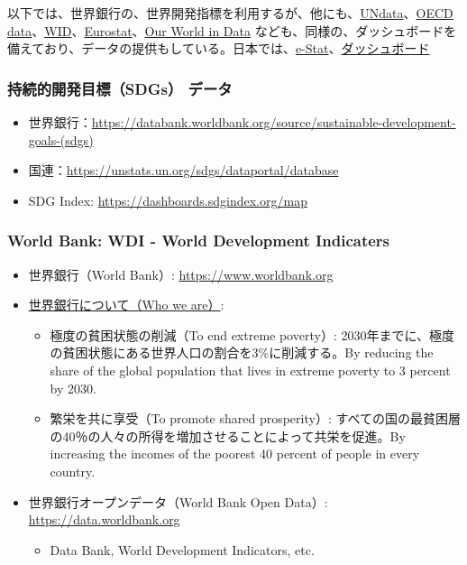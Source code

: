 \documentclass[
]{bxjsbook}
\providecommand{\tightlist}{%
  \setlength{\itemsep}{0pt}\setlength{\parskip}{0pt}}
\theoremstyle{definition}
\theoremstyle{definition}
\theoremstyle{definition}
\theoremstyle{definition}
\theoremstyle{remark}
\begin{document}
以下では、世界銀行の、世界開発指標を利用するが、他にも、\href{https://data.un.org}{UNdata}、\href{https://data.oecd.org}{OECD data}、\href{https://wid.world}{WID}、\href{https://ec.europa.eu/eurostat}{Eurostat}、\href{https://ourworldindata.org}{Our World in Data} なども、同様の、ダッシュボードを備えており、データの提供もしている。日本では、\href{https://www.e-stat.go.jp/}{e-Stat}、\href{https://dashboard.e-stat.go.jp}{ダッシュボード}

\hypertarget{ux6301ux7d9aux7684ux958bux767aux76eeux6a19sdgs-ux30c7ux30fcux30bf}{%
\subsubsection{持続的開発目標（SDGs） データ}\label{ux6301ux7d9aux7684ux958bux767aux76eeux6a19sdgs-ux30c7ux30fcux30bf}}

\begin{itemize}
\tightlist
\item
  世界銀行：\url{https://databank.worldbank.org/source/sustainable-development-goals-(sdgs)}
\item
  国連：\url{https://unstats.un.org/sdgs/dataportal/database}
\item
  SDG Index: \url{https://dashboards.sdgindex.org/map}
\end{itemize}

\hypertarget{world-bank-wdi---world-development-indicaters}{%
\subsubsection{World Bank: WDI - World Development Indicaters}\label{world-bank-wdi---world-development-indicaters}}

\begin{itemize}
\tightlist
\item
  世界銀行（World Bank）: \url{https://www.worldbank.org}
\item
  \href{https://www.worldbank.org/en/who-we-are}{世界銀行について（Who we are）}:

  \begin{itemize}
  \tightlist
  \item
    極度の貧困状態の削減（To end extreme poverty）: 2030年までに、極度の貧困状態にある世界人口の割合を3\%に削減する。By reducing the share of the global population that lives in extreme poverty to 3 percent by 2030.
  \item
    繁栄を共に享受（To promote shared prosperity）: すべての国の最貧困層の40％の人々の所得を増加させることによって共栄を促進。By increasing the incomes of the poorest 40 percent of people in every country.
  \end{itemize}
\item
  世界銀行オープンデータ（World Bank Open Data）: \url{https://data.worldbank.org}

  \begin{itemize}
  \tightlist
  \item
    Data Bank, World Development Indicators, etc.
  \end{itemize}
\end{itemize}
\end{document}
